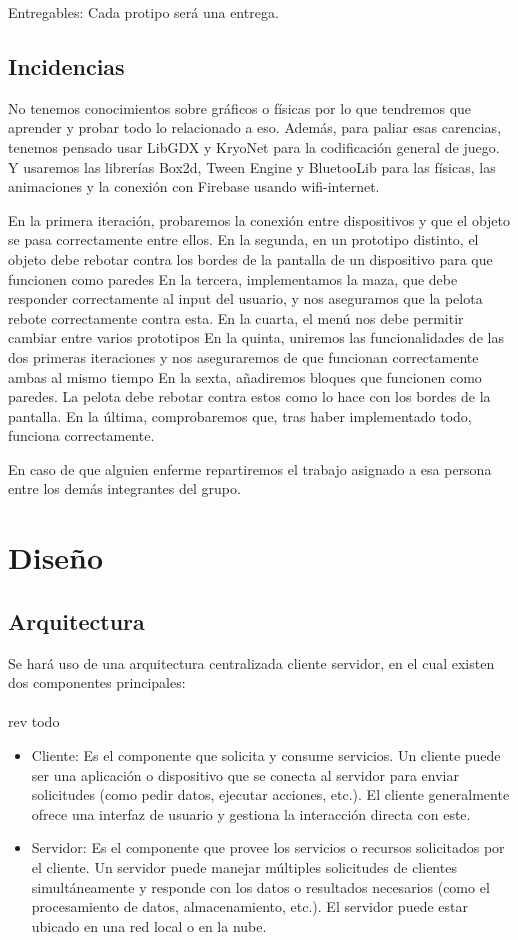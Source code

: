 \documentclass[a4paper,openright,12pt]{article}
\begin{document}
Entregables:
Cada protipo será una entrega.

\subsection{Incidencias}
No tenemos conocimientos sobre gráficos o físicas por lo que tendremos que aprender y probar todo lo relacionado a eso. Además, para paliar esas carencias, tenemos pensado usar LibGDX\cite{misc-libGDX} y KryoNet\cite{misc-kryonetl} para la codificación general de juego. Y usaremos las librerías Box2d\cite{misc-box2d}, Tween Engine\cite{misc-tween} y BluetooLib\cite{misc-bluetooth} para las físicas, las animaciones y la conexión con Firebase usando wifi-internet.
\par
En la primera iteración, probaremos la conexión entre dispositivos y que el objeto se pasa correctamente entre ellos.
En la segunda, en un prototipo distinto, el objeto debe rebotar contra los bordes de la pantalla de un dispositivo para que funcionen como paredes
En la tercera, implementamos la maza, que debe responder correctamente al input del usuario, y nos aseguramos que la pelota rebote correctamente contra esta.
En la cuarta, el menú nos debe permitir cambiar entre varios prototipos
En la quinta, uniremos las funcionalidades de las dos primeras iteraciones y nos aseguraremos de que funcionan correctamente ambas al mismo tiempo
En la sexta, añadiremos bloques que funcionen como paredes. La pelota debe rebotar contra estos como lo hace con los bordes de la pantalla.
En la última, comprobaremos que, tras haber implementado todo, funciona correctamente.
\par
En caso de que alguien enferme repartiremos el trabajo asignado a esa persona entre los demás integrantes del grupo.

\section{Diseño}
\subsection{Arquitectura}
Se hará uso de una arquitectura centralizada cliente servidor, en el cual existen dos componentes principales:\\
\\rev todo\\
\begin{itemize}
    \item Cliente: Es el componente que solicita y consume servicios. Un cliente puede ser una aplicación o dispositivo que se conecta al servidor para enviar solicitudes (como pedir datos, ejecutar acciones, etc.). El cliente generalmente ofrece una interfaz de usuario y gestiona la interacción directa con este.
    \item Servidor: Es el componente que provee los servicios o recursos solicitados por el cliente. Un servidor puede manejar múltiples solicitudes de clientes simultáneamente y responde con los datos o resultados necesarios (como el procesamiento de datos, almacenamiento, etc.). El servidor puede estar ubicado en una red local o en la nube.
\end{itemize}
\end{document}
